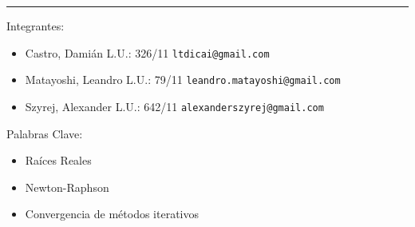 \rule{\linewidth}{0.5mm}

\vspace{2cm}

Integrantes:
\begin{itemize}
	\item Castro, Dami\'an L.U.: 326/11  \verb+ltdicai@gmail.com+
	\item Matayoshi, Leandro L.U.: 79/11 \verb+leandro.matayoshi@gmail.com+
	\item Szyrej, Alexander L.U.: 642/11   \verb+alexanderszyrej@gmail.com+
	
\end{itemize}


\vspace{2cm}

Palabras Clave:
\begin{itemize}
	\item Ra\'ices Reales
	\item Newton-Raphson
	\item Convergencia de m\'etodos iterativos
\end{itemize}


